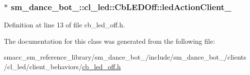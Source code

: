 \subsubsection[{\texorpdfstring{led\+Action\+Client\+\_\+}{ledActionClient_}}]{$\ast$ sm\+\_\+dance\+\_\+bot\+\_\+::cl\+\_\+led\+::\+Cb\+L\+E\+D\+Off\+::led\+Action\+Client\+\_\+}\hypertarget{classsm__dance__bot__3_1_1cl__led_1_1CbLEDOff_a130873f0a017df2f8f5e564df64c0a1e}{}\label{classsm__dance__bot__3_1_1cl__led_1_1CbLEDOff_a130873f0a017df2f8f5e564df64c0a1e}


Definition at line 13 of file cb\+\_\+led\+\_\+off.\+h.



The documentation for this class was generated from the following file\+:\begin{DoxyCompactItemize}
\item 
smacc\+\_\+sm\+\_\+reference\+\_\+library/sm\+\_\+dance\+\_\+bot\+\_/include/sm\+\_\+dance\+\_\+bot\+\_/clients/cl\+\_\+led/client\+\_\+behaviors/\hyperlink{3_2include_2sm__dance__bot__3_2clients_2cl__led_2client__behaviors_2cb__led__off_8h}{cb\+\_\+led\+\_\+off.\+h}\end{DoxyCompactItemize}
